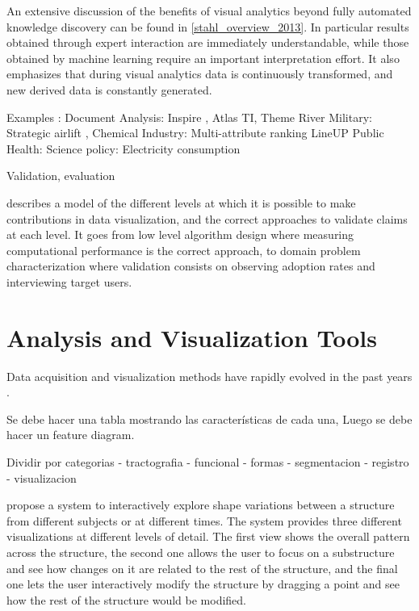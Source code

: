 An extensive discussion of the benefits of visual analytics beyond fully automated knowledge discovery can be found in \ref{stahl_overview_2013}. In particular results obtained through expert interaction are immediately understandable, while those obtained by machine learning require an important interpretation effort. It also emphasizes that during visual analytics data is continuously transformed, and new derived data is constantly generated.


Examples : 
Document Analysis: Inspire \autocite{hetzler_analysis_2004}, Atlas TI, Theme River \autocite{themerivertm:_2002}
Military: Strategic airlift \autocite{soban_visual_2011},
Chemical Industry: \autocite{stahl_overview_2013}
Multi-attribute ranking LineUP \autocite{gratzl_lineup:_2013}
Public Health: \autocite{sedig_challenge_2014}
Science policy: \autocite{mcinerny_information_2014}
Electricity consumption \autocite{janetzko_anomaly_2014}

Validation, evaluation


\autocite{munzner_nested_2009} describes a model of the different levels at which it is possible to make contributions in data visualization, and the correct approaches to validate claims at each level. It goes from low level algorithm design where measuring computational performance is the correct approach, to domain problem characterization where validation consists on observing adoption rates and interviewing target users.


\section{Analysis and Visualization Tools}

Data acquisition and visualization methods have rapidly evolved in the past years \autocite{botha_individual_2012}.

Se debe hacer una tabla mostrando las características de cada una,
Luego se debe hacer un feature diagram.

Dividir por categorias
- tractografia
- funcional
- formas
- segmentacion
- registro
- visualizacion

\autocite{hermann_visual_2014} propose a system to interactively explore shape variations between a structure from different subjects or at different times. The system provides three different visualizations at different levels of detail. The first view shows the overall pattern across the structure, the second one allows the user to focus on a substructure and see how changes on it are related to the rest of the structure, and the final one lets the user interactively modify the structure by dragging a  point and see how the rest of the structure would be modified. 

